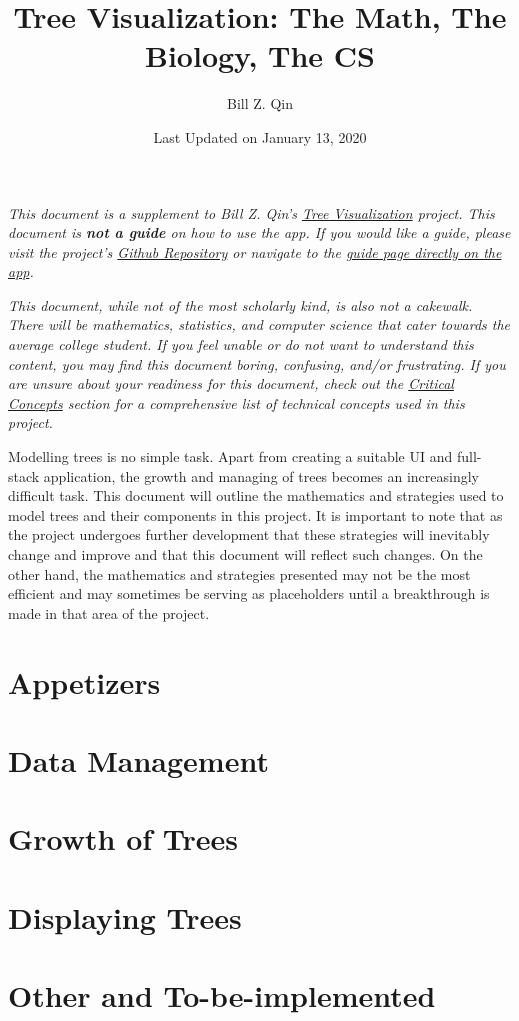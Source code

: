 \documentclass{article}
\title{Tree Visualization: The Math, The Biology, The CS}
\author{Bill Z. Qin}
\date{Last Updated on January 13, 2020}
\begin{document}
\maketitle
\textit{This document is a supplement to Bill Z. Qin's \href{https://treevis.herokuapp.com}{Tree Visualization} project. This document is \textbf{not a guide} on how to use the app. If you would like a guide, please visit the project's \href{https://www.github.com/bqin01/tree-visualization}{Github Repository} or navigate to the \href{https://treevis.herokuapp.com/howto}{guide page directly on the app}.}

\textit{This document, while not of the most scholarly kind, is also not a cakewalk. There will be mathematics, statistics, and computer science that cater towards the average college student. If you feel unable or do not want to understand this content, you may find this document boring, confusing, and/or frustrating. If you are unsure about your readiness for this document, check out the \hyperlink{concepts}{Critical Concepts} section for a comprehensive list of technical concepts used in this project.}

Modelling trees is no simple task. Apart from creating a suitable UI and full-stack application, the growth and managing of trees becomes an increasingly difficult task. This document will outline the mathematics and strategies used to model trees and their components in this project. It is important to note that as the project undergoes further development that these strategies will inevitably change and improve and that this document will reflect such changes. On the other hand, the mathematics and strategies presented may not be the most efficient and may sometimes be serving as placeholders until a breakthrough is made in that area of the project.

\bigskip \bigskip
\toprule

\tableofcontents

\break

\section{Appetizers}



\break

\section{Data Management}



\break

\section{Growth of Trees}



\break

\section{Displaying Trees}



\break

\hypertarget{others}{\section{Other and To-be-implemented}}


\end{document}
